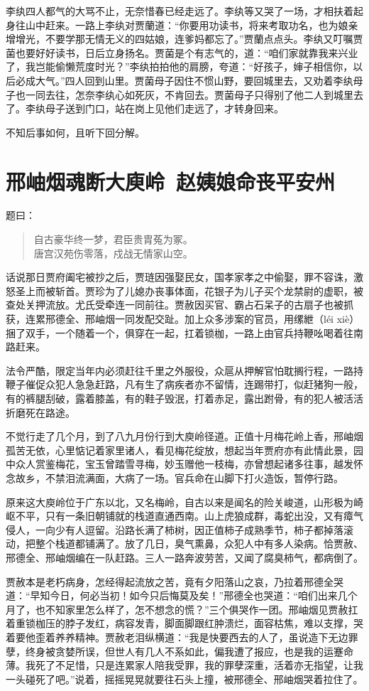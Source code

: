 \documentclass[12pt,oneside]{book}
\newenvironment{shici}{%
\begin{verse}%
\centering\large\hspace{12pt}}%
{\end{verse}}
\begin{document}
李纨四人都气的大骂不止，无奈惜春已经走远了。李纨等又哭了一场，才相扶着起身往山中赶来。一路上李纨对贾蘭道：“你要用功读书，将来考取功名，也为娘亲增增光，不要学那无情无义的四姑娘，连爹妈都忘了。”贾蘭点点头。李纨又叮嘱贾菌也要好好读书，日后立身扬名。贾菌是个有志气的，道：“咱们家就靠我来兴业了，我岂能偷懒荒度时光？”李纨拍拍他的肩膀，夸道：“好孩子，婶子相信你，以后必成大气。”四人回到山里。贾菌母子因住不惯山野，要回城里去，又劝着李纨母子也一同去往，怎奈李纨心如死灰，不肯回去。贾菌母子只得别了他二人到城里去了。李纨母子送到门口，站在岗上见他们走远了，才转身回来。

不知后事如何，且听下回分解。

\chapter{邢岫烟魂断大庾岭~赵姨娘命丧平安州}
题曰：

\begin{shici}
自古豪华终一梦，君臣贵胄菟为冢。\\
唐宫汉苑伤零落，戍战无情家山空。
\end{shici}

话说那日贾府阖宅被抄之后，贾琏因强娶民女，国孝家孝之中偷娶，罪不容诛，激怒圣上而被斩首。贾珍为了儿媳办丧事体面，花银子为儿子买个龙禁尉的虚职，被查处关押流放。尤氏受牵连一同前往。贾赦因买官、霸占石呆子的古扇子也被抓获，连累邢德全、邢岫烟一同发配交趾。加上众多涉案的官员，用缧紲（léi xiè）捆了双手，一个随着一个，俱穿在一起，扛着锁枷，一路上由官兵持鞭吆喝着往南路赶来。

法令严酷，限定当年内必须赶往千里之外服役，众扈从押解官怕耽搁行程，一路持鞭子催促众犯人急急赶路，凡有生了病疾者亦不留情，连踢带打，似赶猪狗一般，有的裤腿刮破，露着膝盖，有的鞋子毁泯，打着赤足，露出跗骨，有的犯人被活活折磨死在路途。

不觉行走了几个月，到了八九月份行到大庾岭径道。正值十月梅花岭上香，邢岫烟孤苦无依，心里惦记着家里诸人，看见梅花绽放，想起当年贾府亦有此情此景，园中众人赏鉴梅花，宝玉曾踏雪寻梅，妙玉赠他一枝梅，亦曾想起诸多往事，越发怀念故乡，不禁泪流满面，大病了一场。官兵命在山脚下打火造饭，暂停行路。

原来这大庾岭位于广东以北，又名梅岭，自古以来是闻名的险关峻道，山形极为崎岖不平，只有一条旧朝铺就的栈道直通西南。山上虎狼成群，毒蛇出没，又有瘴气侵人，一向少有人逗留。沿路长满了柿树，因正值柿子成熟季节，柿子都掉落滚动，把整个栈道都铺满了。放了几日，臭气熏鼻，众犯人中有多人染病。恰贾赦、邢德全、邢岫烟编在一队赶路。三人一路奔波劳苦，又闻了腐臭柿气，都病倒了。

贾赦本是老朽病身，怎经得起流放之苦，竟有夕阳落山之哀，乃拉着邢德全哭道：“早知今日，何必当初！如今只后悔莫及矣！”邢德全也哭道：“咱们出来几个月了，也不知家里怎么样了，怎不想念的慌？”三个俱哭作一团。邢岫烟见贾赦扛着重锁枷压的脖子发红，病容发青，脚面脚跟红肿溃烂，面容枯焦，难以支撑，哭着要他歪着养养精神。贾赦老泪纵横道：“我是快要西去的人了，虽说造下无边罪孽，终身被贪婪所误，但世人有几人不系如此，偏我遭了报应，也是我的运蹇命薄。我死了不足惜，只是连累家人陪我受罪，我的罪孽深重，活着亦无指望，让我一头碰死了吧。”说着，摇摇晃晃就要往石头上撞，被邢德全、邢岫烟哭着拉住了。
\end{document}
